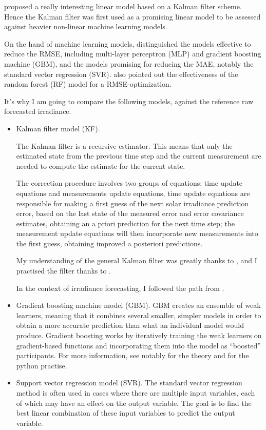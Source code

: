 \cite{suksamosorn_post-processing_2021} proposed a really interesting linear model based on a Kalman filter scheme. Hence the Kalman filter was first used as a promising linear model to be 
assessed against heavier non-linear machine learning models.

On the hand of machine learning models, \cite{verbois_statistical_2022} distinguished the models effective to reduce the RMSE, including multi-layer perceptron (MLP) and gradient boosting machine (GBM),
and the models promising for reducing the MAE, notably the standard vector regression (SVR).
\cite{suksamosorn_post-processing_2021} also pointed out the effectiveness of the random forest (RF) model for a RMSE-optimization.

It's why I am going to compare the following models, against the reference raw forecasted irradiance.
\begin{itemize}
    \item Kalman filter model (KF).

The Kalman filter is a recursive estimator. This means that only the estimated state from the previous time step and the current measurement are needed to compute the estimate for the current state.

The correction procedure involves two groups of equations: time update equations
and measurements update equations, time update equations are responsible for making
a first guess of the next solar irradiance prediction error, based on the last state of the
measured error and error covariance estimates, obtaining an a priori prediction for the next
time step; the measurement update equations will then incorporate new measurements
into the first guess, obtaining improved a posteriori predictions.

My understanding of the general Kalman filter was greatly thanks to \cite{kfbasis}, and I practised the filter thanks to \cite{kfpractise}.

In the context of irradiance forecasting, I followed the path from \cite{suksamosorn_post-processing_2021}.
    \item Gradient boosting machine model (GBM).
GBM creates an ensemble of weak learners, meaning that it combines several smaller, simpler models in order to obtain a more accurate prediction than what an individual model would produce. Gradient boosting works by iteratively training the weak learners on gradient-based functions and incorporating them into the model as “boosted” participants. 
For more information, see notably \cite{GBMbasis} for the theory and \cite{GBMpractise} for the python practise.
    \item Support vector regression model (SVR).
    The standard vector regression method is often used in cases where there are multiple input variables, each of which may have an effect on the output variable. The goal is to find the best linear combination of these input variables to predict the output variable.


\end{itemize}
